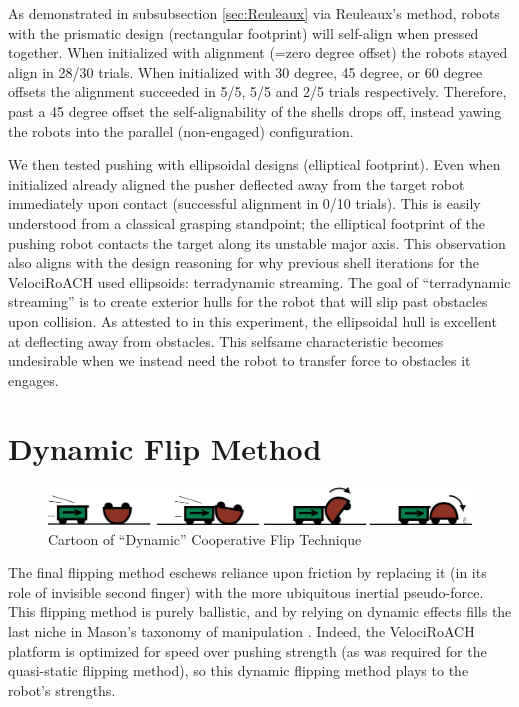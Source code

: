 \documentclass[letterpaper, 10 pt, conference]{ieeeconf}
\begin{document}
As demonstrated in subsubsection \ref{sec:Reuleaux} via Reuleaux's method, robots with the prismatic design (rectangular footprint) will self-align when pressed together.
When initialized with alignment (=zero degree offset) the robots stayed align in 28/30 trials.
When initialized with 30 degree, 45 degree, or 60 degree offsets the alignment succeeded in 5/5, 5/5 and 2/5 trials respectively.
Therefore, past a 45 degree offset the self-alignability of the shells drops off, instead yawing the robots into the parallel (non-engaged) configuration.

We then tested pushing with ellipsoidal designs (elliptical footprint).
Even when initialized already aligned the pusher deflected away from the target robot immediately upon contact (successful alignment in 0/10 trials).
This is easily understood from a classical grasping standpoint; the elliptical footprint of the pushing robot contacts the target along its unstable major axis.
This observation also aligns with the design reasoning for why previous shell iterations for the VelociRoACH used ellipsoids: terradynamic streaming.
The goal of ``terradynamic streaming'' is to create exterior hulls for the robot that will slip past obstacles upon collision.
As attested to in this experiment, the ellipsoidal hull is excellent at deflecting away from obstacles.
This selfsame characteristic becomes undesirable when we instead need the robot to transfer force to obstacles it engages.




\section{Dynamic Flip Method}
\begin{figure}[ht]
\centering
\includegraphics[width=1.0\columnwidth]{Dynamic_CoopCartoon.png}
\caption{Cartoon of ``Dynamic'' Cooperative Flip Technique \label{fig:DynCartoon}}
\end{figure}
The final flipping method eschews reliance upon friction by replacing it (in its role of invisible second finger) with the more ubiquitous inertial pseudo-force.
This flipping method is purely ballistic, and by relying on dynamic effects fills the last niche in Mason's taxonomy of manipulation \cite{MasonMORMBook}.
Indeed, the VelociRoACH platform is optimized for speed over pushing strength (as was required for the quasi-static flipping method), so this dynamic flipping method plays to the robot's strengths.
\end{document}
